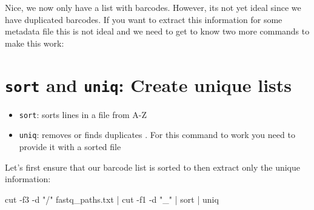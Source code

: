 \documentclass[
  letterpaper,
  DIV=11,
  numbers=noendperiod]{scrreprt}
\newenvironment{Shaded}{}{}
\newcommand{\AttributeTok}[1]{\textcolor[rgb]{0.84,0.23,0.29}{#1}}
\newcommand{\FunctionTok}[1]{\textcolor[rgb]{0.44,0.26,0.76}{#1}}
\newcommand{\KeywordTok}[1]{\textcolor[rgb]{0.84,0.23,0.29}{#1}}
\newcommand{\NormalTok}[1]{\textcolor[rgb]{0.14,0.16,0.18}{#1}}
\newcommand{\StringTok}[1]{\textcolor[rgb]{0.01,0.18,0.38}{#1}}
\providecommand{\tightlist}{%
  \setlength{\itemsep}{0pt}\setlength{\parskip}{0pt}}\usepackage{longtable,booktabs,array}
\begin{document}
Nice, we now only have a list with barcodes. However, its not yet ideal
since we have duplicated barcodes. If you want to extract this
information for some metadata file this is not ideal and we need to get
to know two more commands to make this work:

\section{\texorpdfstring{\texttt{sort} and \texttt{uniq}: Create unique
lists}{sort and uniq: Create unique lists}}\label{sort-and-uniq-create-unique-lists}

\begin{itemize}
\tightlist
\item
  \texttt{sort}: sorts lines in a file from A-Z
\item
  \texttt{uniq}: removes or finds duplicates . For this command to work
  you need to provide it with a sorted file
\end{itemize}

Let's first ensure that our barcode list is sorted to then extract only
the unique information:

\begin{Shaded}
\begin{Highlighting}[]
\FunctionTok{cut} \AttributeTok{{-}f3} \AttributeTok{{-}d} \StringTok{"/"}\NormalTok{ fastq\_paths.txt }\KeywordTok{|} \FunctionTok{cut} \AttributeTok{{-}f1} \AttributeTok{{-}d} \StringTok{"\_"} \KeywordTok{|} \FunctionTok{sort} \KeywordTok{|} \FunctionTok{uniq}
\end{Highlighting}
\end{Shaded}
\end{document}
